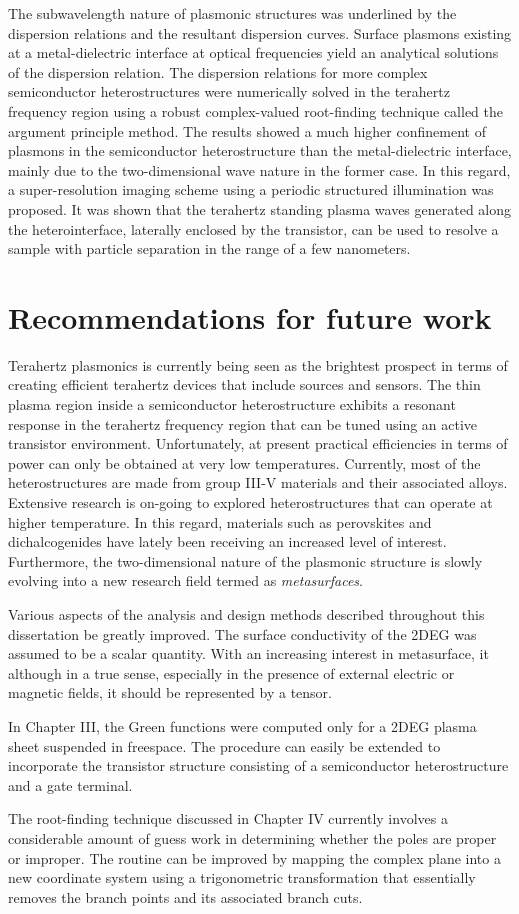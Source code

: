 The subwavelength nature of plasmonic structures was underlined by the dispersion relations and the resultant dispersion curves. Surface plasmons existing at a metal-dielectric interface at optical frequencies yield an analytical solutions of the dispersion relation. The dispersion relations for more complex semiconductor heterostructures were numerically solved in the terahertz frequency region using a robust complex-valued root-finding technique called the argument principle method. The results showed a much higher confinement of plasmons in the semiconductor heterostructure than the metal-dielectric interface, mainly due to the two-dimensional wave nature in the former case. In this regard, a super-resolution imaging scheme using a periodic structured illumination was proposed. It was shown that the terahertz standing plasma waves generated along the heterointerface, laterally enclosed by the transistor, can be used to resolve a sample with particle separation in the range of a few nanometers.

\section*{Recommendations for future work}
%
%
Terahertz plasmonics is currently being seen as the brightest prospect in terms of creating efficient terahertz devices that include sources and sensors. The thin plasma region inside a semiconductor heterostructure exhibits a resonant response in the terahertz frequency region that can be tuned using an active transistor environment. Unfortunately, at present practical efficiencies in terms of power can only be obtained at very low temperatures. Currently, most of the heterostructures are made from group III-V materials and their associated alloys. Extensive research is on-going to explored heterostructures that can operate at higher temperature. In this regard, materials such as perovskites and dichalcogenides have lately been receiving an increased level of interest. Furthermore, the two-dimensional nature of the plasmonic structure is slowly evolving into a new research field termed as \emph{metasurfaces}.

Various aspects of the analysis and design methods described throughout this dissertation be greatly improved. The surface conductivity of the 2DEG was assumed to be a scalar quantity. With an increasing interest in metasurface, it  although in a true sense, especially in the presence of external electric or magnetic fields, it should be represented by a tensor.

In Chapter III, the Green functions were computed only for a 2DEG plasma sheet suspended in freespace. The procedure can easily be extended to incorporate the transistor structure consisting of a semiconductor heterostructure and a gate terminal.

The root-finding technique discussed in Chapter IV currently involves a considerable amount of guess work in determining whether the poles are proper or improper. The routine can be improved by mapping the complex plane into a new coordinate system using a trigonometric transformation that essentially removes the branch points and its associated branch cuts.
